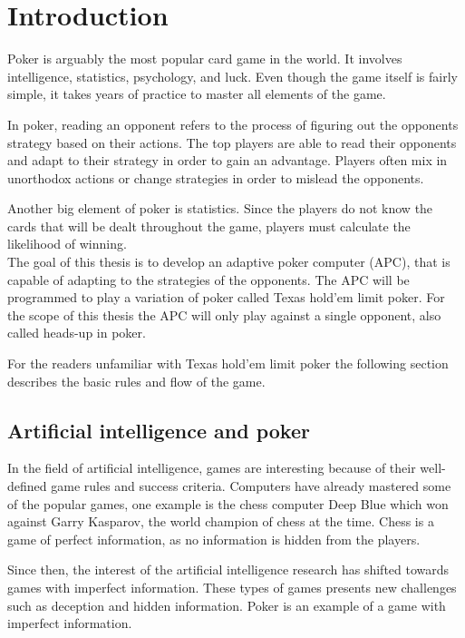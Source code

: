 \section*{Introduction}
Poker is arguably the most popular card game in the world. It involves intelligence, statistics, psychology, and luck. Even though the game itself is fairly simple, it takes years of practice to master all elements of the game.

In poker, reading an opponent refers to the process of figuring out the opponents strategy based on their actions. The top players are able to read their opponents and adapt to their strategy in order to gain an advantage. Players often mix in unorthodox actions or change strategies in order to mislead the opponents.

Another big element of poker is statistics. Since the players do not know the cards that will be dealt throughout the game, players must calculate the likelihood of winning. \\

The goal of this thesis is to develop an adaptive poker computer (APC), that is capable of adapting to the strategies of the opponents. The APC will be programmed to play a variation of poker called Texas hold'em limit poker. For the scope of this thesis the APC will only play against a single opponent, also called heads-up in poker.

For the readers unfamiliar with Texas hold'em limit poker the following section describes the basic rules and flow of the game.



\subsection*{Artificial intelligence and poker}
In the field of artificial intelligence, games are interesting because of their well-defined game rules and success criteria.
Computers have already mastered some of the popular games, one example is the chess computer Deep Blue which won against Garry Kasparov, the world champion of chess at the time.
Chess is a game of perfect information, as no information is hidden from the players.

Since then, the interest of the artificial intelligence research has shifted towards games with imperfect information. These types of games presents new challenges such as deception and hidden information. Poker is an example of a game with imperfect information.\\


